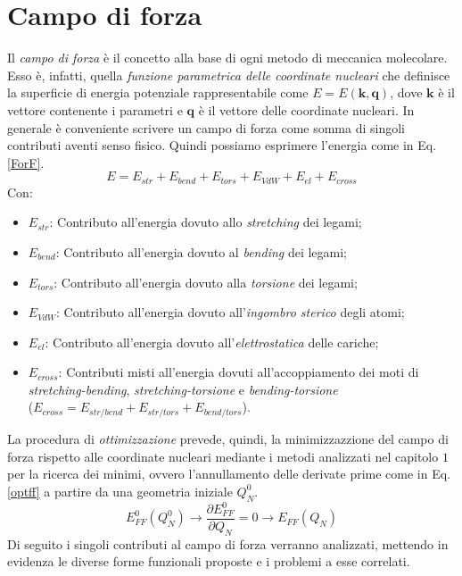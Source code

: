 \documentclass[oneside]{amsbook}
\numberwithin{section}{chapter}
\numberwithin{equation}{section}
\numberwithin{figure}{section}
\begin{document}
\section{Campo di forza}
Il \emph{campo di forza}  è il concetto alla base di ogni metodo di meccanica molecolare. Esso è, infatti, quella \emph{funzione parametrica delle coordinate nucleari} che definisce la superficie di energia potenziale rappresentabile come $E=E(\mathbf{k},\mathbf{q})$, dove $\mathbf{k}$ è il vettore contenente i parametri e $\mathbf{q}$ è il vettore delle coordinate nucleari.
In generale è conveniente scrivere un campo di forza come somma di singoli contributi aventi senso fisico. Quindi possiamo esprimere l'energia come in Eq.\ref{ForF}.
\begin{equation}
\label{ForF}
E= E_{str}+E_{bend}+E_{tors}+E_{VdW}+E_{el}+E_{cross}
\end{equation}
Con:
\begin{itemize}
\item $ E_{str}$: Contributo all'energia dovuto allo \emph{stretching} dei legami;
\item $E_{bend}$: Contributo all'energia dovuto al \emph{bending} dei legami;
\item $E_{tors}$: Contributo all'energia dovuto alla \emph{torsione} dei legami;
\item $E_{VdW} $: Contributo all'energia dovuto all'\emph{ingombro sterico} degli atomi;
\item $E_{el}  $: Contributo all'energia dovuto all'\emph{elettrostatica} delle cariche;
\item $E_{cross}$: Contributi misti all'energia dovuti all'accoppiamento dei moti di \emph{stretching-bending}, \emph{stretching-torsione} e \emph{bending-torsione}\\ ($E_{cross}=E_{str/bend}+E_{str/tors}+E_{bend/tors}$).
\end{itemize}
La procedura di \emph{ottimizzazione } prevede, quindi, la minimizzazzione del campo di forza rispetto alle coordinate nucleari mediante i metodi analizzati nel capitolo $1$ per la ricerca dei minimi, ovvero l'annullamento delle derivate prime come in Eq.\ref{optff} a partire da una geometria iniziale $Q_N^0$.
\begin{equation}
\label{optff}
E_{FF}^0(Q_N^0)\longrightarrow \frac{\partial E_{FF}^0}{\partial Q_N}=0 \longrightarrow E_{FF}(Q_N)
\end{equation}
Di seguito i singoli contributi al campo di forza verranno analizzati, mettendo in evidenza le diverse forme funzionali proposte e i problemi a esse correlati.
\end{document}
